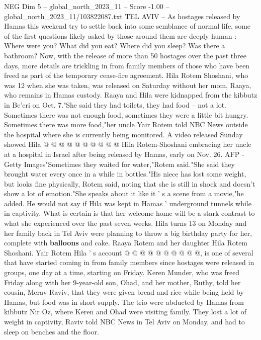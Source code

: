 \begin{textsample}{NEG Dim 5 – global\_north\_2023\_11 – Score -1.00 – global\_north\_2023\_11/103822087.txt}  \label{ex:f5_neg_046}
TEL AVIV -- As hostages released by Hamas this weekend try to settle back into some semblance of normal life, some of the first questions likely asked by those around them are deeply human : Where were you?
What did you eat?
Where did you sleep?
Was there a bathroom?
Now, with the release of more than 50 hostages over the past three days, more details are trickling in from family members of those who have been freed as part of the temporary cease-fire agreement.
Hila Rotem Shoshani, who was 12 when she was taken, was released on Saturday without her mom, Raaya, who remains in Hamas custody.
Raaya and Hila were kidnapped from the kibbutz in Be'eri on Oct. 7."She said they had toilets, they had food -- not a lot.
Sometimes there was not enough food, sometimes they were a little bit hungry.
Sometimes there was more food,"her uncle Yair Rotem told NBC News outside the hospital where she is currently being monitored.
A video released Sunday showed Hila @ @ @ @ @ @ @ @ @ @ Hila Rotem-Shoshani embracing her uncle at a hospital in Israel after being released by Hamas, early on Nov. 26.
AFP - Getty Images"Sometimes they waited for water,"Rotem said."She said they brought water every once in a while in bottles."His niece has lost some weight, but looks fine physically, Rotem said, noting that she is still in shock and doesn't show a lot of emotion."She speaks about it like it ' s a scene from a movie,"he added.
He would not say if Hila was kept in Hamas ' underground tunnels while in captivity.
What is certain is that her welcome home will be a stark contrast to what she experienced over the past seven weeks.
Hila turns 13 on Monday and her family back in Tel Aviv were planning to throw a big birthday party for her, complete with \textbf{balloons} and cake.
Raaya Rotem and her daughter Hila Rotem Shoshani.
Yair Rotem Hila ' s account @ @ @ @ @ @ @ @ @ @, is one of several that have started coming in from family members since hostages were released in groups, one day at a time, starting on Friday.
Keren Munder, who was freed Friday along with her 9-year-old son, Ohad, and her mother, Ruthy, told her cousin, Merav Raviv, that they were given bread and rice while being held by Hamas, but food was in short supply.
The trio were abducted by Hamas from kibbutz Nir Oz, where Keren and Ohad were visiting family.
They lost a lot of weight in captivity, Raviv told NBC News in Tel Aviv on Monday, and had to sleep on benches and the floor.

\end{textsample}
